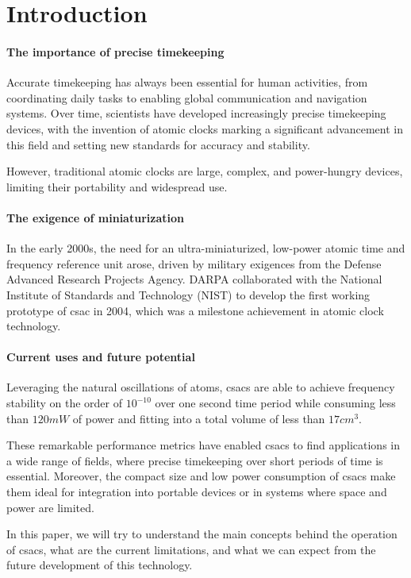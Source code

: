 \section{Introduction}
\label{sec:introduction}

\paragraph{The importance of precise timekeeping}

Accurate timekeeping has always been essential for human activities, from coordinating daily tasks to enabling global communication and navigation systems.
Over time, scientists have developed increasingly precise timekeeping devices, with the invention of atomic clocks marking a significant advancement in this field and setting new standards for accuracy and stability.

However, traditional atomic clocks are large, complex, and power-hungry devices, limiting their portability and widespread use.

\paragraph{The exigence of miniaturization}

In the early 2000s, the need for an ultra-miniaturized, low-power atomic time and frequency reference unit arose, driven by military exigences from the Defense Advanced Research Projects Agency.
DARPA collaborated with the National Institute of Standards and Technology (NIST) to develop the first working prototype of \acrfull{csac} in 2004, which was a milestone achievement in atomic clock technology.

\paragraph{Current uses and future potential}

Leveraging the natural oscillations of atoms, \acrshort{csacs} are able to achieve frequency stability on the order of $10^{-10}$ over one second time period while consuming less than $120 mW$ of power and fitting into a total volume of less than $17 cm^3$.

These remarkable performance metrics have enabled \acrshort{csacs} to find applications in a wide range of fields, where precise timekeeping over short periods of time is essential.
Moreover, the compact size and low power consumption of \acrshort{csacs} make them ideal for integration into portable devices or in systems where space and power are limited.

In this paper, we will try to understand the main concepts behind the operation of \acrshort{csacs}, what are the current limitations, and what we can expect from the future development of this technology.